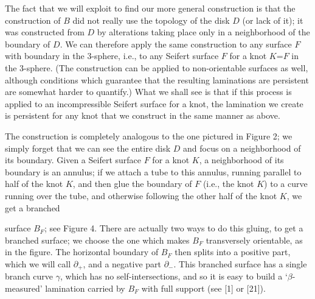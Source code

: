 
\msk

The fact that we will exploit to find our more general construction 
is that the construction of $B$ did not really use the topology of 
the disk $D$ (or lack of it); it was constructed from $D$ by alterations
taking place
only in a neighborhood of the boundary of $D$. We can therefore apply 
the same
construction to any surface $F$ with boundary in the 3-sphere, i.e., 
to any Seifert surface $F$ for a knot $K$=\del$F$ in the 3-sphere. (The 
construction can be applied to non-orientable surfaces as well, although
conditions which guarantee that the resulting laminations are persistent
are somewhat harder to quantify.)
What we shall see is that if this process is applied to an 
incompressible Seifert surface for a knot, the lamination we create 
is persistent for any knot that we construct in the same manner as above.

\vglue 12pt
\vglue 5pt


The construction is completely analogous to the one pictured in Figure 
2; we simply forget that we can see the entire disk $D$ and focus on 
a neighborhood of its boundary. Given a Seifert surface $F$ for a knot 
$K$, a neighborhood of its boundary is an annulus; if we attach a 
tube to this annulus, running parallel to half of the knot $K$, and 
then glue the boundary of $F$ (i.e., the knot $K$) to a curve running over the 
tube, and otherwise following the other half of the knot $K$, we get 
a branched 

\smallskip

\leavevmode

\epsfxsize=2.5in
\centerline{{}}


\msk

\noindent surface $B_F$; see Figure 4. There are actually two ways to do this gluing,
to get a branched surface; we choose the one which makes $B_F$ transversely 
orientable, as in the figure. The horizontal boundary of $B_F$ then splits into a positive 
part, which we will call $\partial_+$, and a negative part 
$\partial_-$. This branched surface has a single branch curve $\gamma$, which 
has no self-intersections, and so it is easy to build a `$\beta$-measured' lamination 
\clsp carried by $B_F$ with full support (see [1] or [21]).

